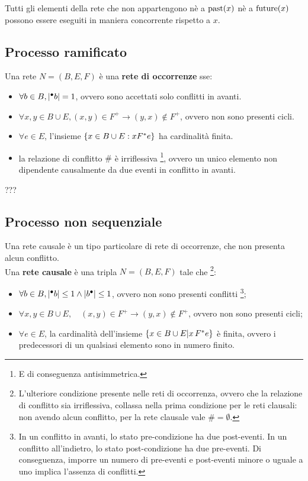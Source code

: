 \begin{rem}
    Tutti gli elementi della rete che non appartengono nè a $\textnormal{past}(x)$ nè a $\textnormal{future}(x)$ possono essere eseguiti in maniera concorrente rispetto a $x$.
\end{rem}

\subsection{Processo ramificato}
\begin{defn}
    Una rete $N = (B, E, F)$ è una \textbf{rete di occorrenze} sse:
    \begin{itemize}
        \item $\forall b \in B, |{^\bullet}b| = 1$, ovvero sono accettati solo conflitti in avanti.
        \item $\forall x, y \in B \cup E, (x,y) \in F^+ \rightarrow (y,x) \notin F^+$, ovvero non sono presenti cicli.
        \item $\forall e \in E$, l'insieme $\left\{x \in B \cup E : x F^*e\right\}$ ha cardinalità finita.
        \item la relazione di conflitto $\#$ è irriflessiva \footnote{E di conseguenza antisimmetrica.}, ovvero un unico elemento non dipendente causalmente da due eventi in conflitto in avanti.
    \end{itemize}
\end{defn}
???

\subsection{Processo non sequenziale}
Una rete causale è un tipo particolare di rete di occorrenze, che non presenta alcun conflitto.\\
Una \textbf{rete causale} è una tripla $N = (B, E, F)$ tale che \footnote[][-1cm]{L'ulteriore condizione presente nelle reti di occorrenza, ovvero che la relazione di conflitto sia irriflessiva, collassa nella prima condizione per le reti clausali: non avendo alcun conflitto, per la rete clausale vale $\# = \emptyset$.}:
\begin{itemize}
    \item $\forall b \in B, \lvert {^\bullet}b \rvert \le 1 \land \lvert b^\bullet \rvert \le 1$, ovvero non sono presenti conflitti \footnote[][1cm]{In un conflitto in avanti, lo stato pre-condizione ha due post-eventi. In un conflitto all'indietro, lo stato post-condizione ha due pre-eventi. Di conseguenza, imporre un numero di pre-eventi e post-eventi minore o uguale a uno implica l'assenza di conflitti.};
    \item $\forall x, y \in B \cup E, \quad (x, y) \in F^+ \rightarrow (y, x) \notin F^+$, ovvero non sono presenti cicli;
    \item $\forall e \in E$, la cardinalità dell'insieme $\left\{x \in B \cup E | x \, F^* e\right\}$ è finita, ovvero i predecessori di un qualsiasi elemento sono in numero finito.
\end{itemize}

